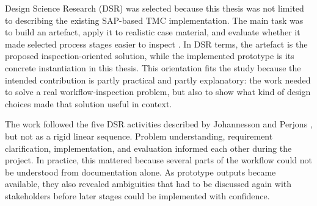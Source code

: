 



Design Science Research (DSR) was selected because this thesis was not limited to describing the existing SAP-based TMC implementation. The main task was to build an artefact, apply it to realistic case material, and evaluate whether it made selected process stages easier to inspect \cite{johannesson2021,hevner2004design}. In DSR terms, the artefact is the proposed inspection-oriented solution, while the implemented prototype is its concrete instantiation in this thesis. This orientation fits the study because the intended contribution is partly practical and partly explanatory: the work needed to solve a real workflow-inspection problem, but also to show what kind of design choices made that solution useful in context.

The work followed the five DSR activities described by Johannesson and Perjons \cite{johannesson2021}, but not as a rigid linear sequence. Problem understanding, requirement clarification, implementation, and evaluation informed each other during the project. In practice, this mattered because several parts of the workflow could not be understood from documentation alone. As prototype outputs became available, they also revealed ambiguities that had to be discussed again with stakeholders before later stages could be implemented with confidence.

